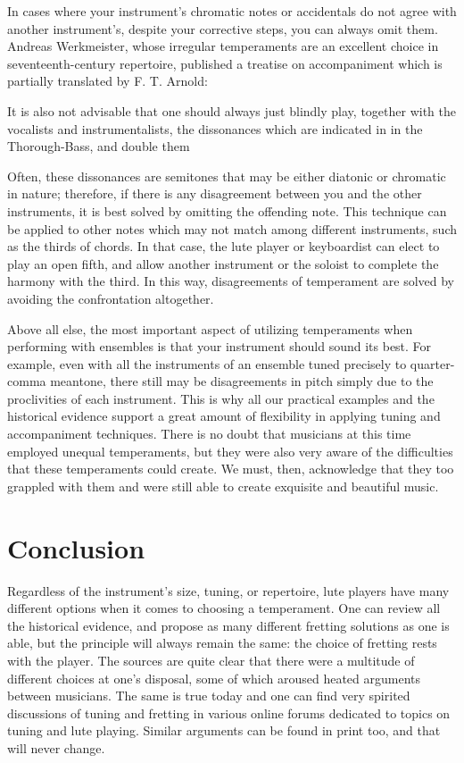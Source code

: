 In cases where your instrument's chromatic notes or accidentals do not agree with another
instrument's, despite your corrective steps, you can always omit them. Andreas
Werkmeister, whose irregular temperaments are an excellent choice in seventeenth-century repertoire,
published a treatise on accompaniment which is partially translated by F. T. Arnold:
\begin{blocks}
It is also not advisable that one should always just blindly play, together with the vocalists
and instrumentalists, the dissonances which are indicated in in the Thorough-Bass, and double
them
\autocite[210]{FTA:1}
\end{blocks}
Often, these dissonances are semitones that may be either diatonic or chromatic
in nature; therefore, if there is any disagreement between you and the other
instruments, it is best solved by omitting the offending note. This technique
can be applied to other notes which may not match among different
instruments, such as the thirds of chords.  In that case, the lute player or
keyboardist can elect to play an open fifth, and allow another instrument or the
soloist to complete the harmony with the third.  In this way, disagreements of
temperament are solved by avoiding the confrontation altogether.

Above all else, the most important aspect of utilizing temperaments when performing with ensembles
is that your instrument should sound its best. For example, even with all the instruments of an ensemble tuned
precisely to quarter-comma meantone, there still may be disagreements in pitch simply due to the
proclivities of each instrument. This is why all our practical examples and the historical evidence
support a great amount of flexibility in applying tuning and accompaniment techniques. There is no
doubt that musicians at this time employed unequal temperaments, but they were also very aware of
the difficulties that these temperaments could create.  We must, then, acknowledge that they too
grappled with them and were still able to create exquisite and beautiful music.

\section{Conclusion}

Regardless of the instrument's size, tuning, or repertoire, lute players have many different options
when it comes to choosing a temperament.  One can review all the historical evidence, and propose as
many different fretting solutions as one is able, but the principle will always remain the same: the
choice of fretting rests with the player. The sources are quite clear that there were a
multitude of different choices at one's disposal, some of which aroused heated arguments between
musicians. The same is true today and one can find very spirited discussions of tuning and
fretting in various online forums dedicated to topics on tuning and lute playing. Similar arguments
can be found in print too, and that will never change. \autocite{DD:4}


